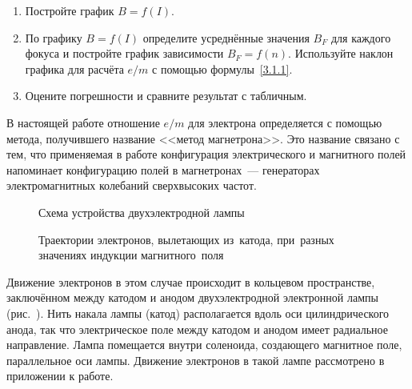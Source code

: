 \begin{lab:task}

\begin{enumerate}
\item{Постройте график $B=f(I)$.}
\item{По графику $B=f(I)$ определите усреднённые значения $B_F$ для каждого фокуса и постройте график зависимости $B_F=f(n)$. Используйте наклон графика для расчёта $e/m$ с помощью формулы~\eqref{3.1.1}.}
\item{Оцените погрешности и сравните результат с табличным.}

\end{enumerate}
\end{lab:task}



В настоящей работе отношение $e/m$ для электрона определяется с помощью метода, получившего название <<метод
магнетрона>>. Это название связано с тем, что применяемая в работе конфигурация электрического и магнитного полей
напоминает конфигурацию полей в магнетронах~--- генераторах электромагнитных колебаний сверхвысоких частот.

\begin{figure}[h!]
	\begin{minipage}[b]{0.49\textwidth}
		\caption{Схема устройства двухэлектродной лампы}
	\end{minipage}
	\hfill
	\begin{minipage}[b]{0.49\textwidth}
		\caption{Траектории электронов, вылетающих из~катода, при~разных значениях индукции магнитного~поля}
	\end{minipage}
\end{figure}

Движение электронов в этом случае происходит в кольцевом пространстве, заключённом между катодом и анодом
двухэлектродной электронной лампы (рис.~). Нить накала лампы (катод) располагается вдоль оси цилиндрического анода, так что электрическое поле между катодом и анодом имеет радиальное направление. Лампа помещается внутри соленоида, создающего магнитное поле, параллельное оси лампы. Движение электронов в такой лампе рассмотрено в приложении к работе.

